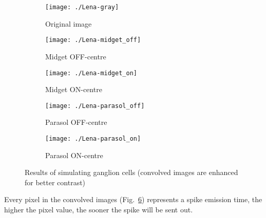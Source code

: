 \begin{figure}[hbt]
  \centering
  \begin{subfigure}[t]{0.15\textwidth}
    \centering
    \captionsetup{justification=centering,margin=0.1cm}
    \texttt{[image: ./Lena-gray]}
    \caption{Original image}
    \label{pic-lena}
  \end{subfigure}
  \begin{subfigure}[t]{0.15\textwidth}
    \centering
    \captionsetup{justification=centering,margin=0.1cm}
    \texttt{[image: ./Lena-midget\_off]}
    \caption{Midget OFF-centre}
    \label{pic-lena-M-OFF}
  \end{subfigure}
  \begin{subfigure}[t]{0.15\textwidth}
    \centering
    \captionsetup{justification=centering,margin=0.1cm}
    \texttt{[image: ./Lena-midget\_on]}
    \caption{Midget ON-centre}
    \label{pic-lena-M-ON}
  \end{subfigure}
  \begin{subfigure}[t]{0.15\textwidth}
    \centering
    \captionsetup{justification=centering,margin=0.1cm}
    \texttt{[image: ./Lena-parasol\_off]}
    \caption{Parasol OFF-centre}
    \label{pic-lena-P-OFF}
  \end{subfigure}
  \begin{subfigure}[t]{0.15\textwidth}
    \centering
    \captionsetup{justification=centering,margin=0.1cm}
    \texttt{[image: ./Lena-parasol\_on]}
    \caption{Parasol ON-centre}
    \label{pic-lena-P-ON}
  \end{subfigure}
  \caption{Results of simulating ganglion cells (convolved images are enhanced for better contrast)}
  \label{fig-convolution-results}
\end{figure}
Every pixel in the convolved images (Fig.~\ref{fig-convolution-results}) 
represents a spike emission time, the higher the pixel value, the sooner the 
spike will be sent out.
